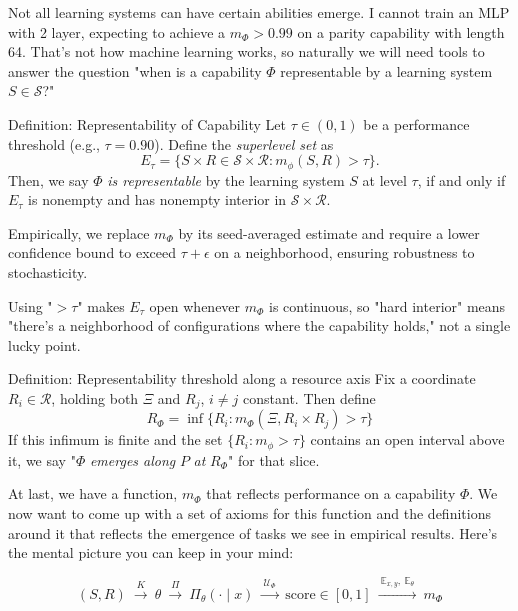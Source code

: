 \documentclass[12pt]{article}
\begin{document}
Not all learning systems can have certain abilities emerge. I cannot train an MLP with 2 layer, expecting to achieve a $m_\Phi>0.99$ on a parity capability with length 64. That's not how machine learning works, so naturally we will need tools to answer the question "when is a capability $\Phi$ representable by a learning system $S\in \mathcal S $?"

\begin{statementbox}{Definition: Representability of Capability}
    Let $\tau \in (0,1)$ be a performance threshold (e.g., $\tau=0.90$). Define the \textit{superlevel set} as
    \[
        E_\tau =\{ S\times R \in \mathcal S \times \mathcal R: m_\phi(S,R)>\tau \}.
    \]
    Then, we say $\Phi$ \textit{is representable} by the learning system $S$ at level $\tau$, if and only if $E_\tau$ is nonempty and has nonempty interior in $\mathcal S \times \mathcal R$.
\end{statementbox}

Empirically, we replace $m_\Phi$ by its seed-averaged estimate and require a lower confidence bound to exceed $\tau + \epsilon$ on a neighborhood, ensuring robustness to stochasticity.

Using "$>\tau$" makes $E_\tau$ open whenever $m_\Phi$ is continuous, so "hard interior" means "there's a neighborhood of configurations where the capability holds," not a single lucky point.

\begin{statementbox}{Definition: Representability threshold along a resource axis}
    Fix a coordinate $R_i\in \mathcal R$, holding both $\Xi$ and $R_j$, $i\ne j$ constant. Then define
    \[
        R_\Phi = \inf \{ R_i : m_\Phi (\Xi, R_i\times R_j)>\tau\}
    \]
    If this infimum is finite and the set $\{ R_i : m_\phi >\tau\}$ contains an open interval above it, we say "$\Phi$ \textit{emerges along} $P$ \textit{at} $R_\Phi$" for that slice.
\end{statementbox}

At last, we have a function, $m_\Phi$ that reflects performance on a capability $\Phi$. We now want to come up with a set of axioms for this function and the definitions around it that reflects the emergence of tasks we see in empirical results. Here’s the mental picture you can keep in your mind:

\[
(S,R)\ \xrightarrow{\ K\ }\ \theta\ \xrightarrow{\ \Pi\ }\ \Pi_\theta(\cdot\mid x)\ \xrightarrow{\ \mathcal U_\Phi\ }\ \text{score}\in [0,1]\ \xrightarrow{\ \mathbb E_{x,y},\ \mathbb E_\theta\ }\ m_\Phi
\]
\end{document}

